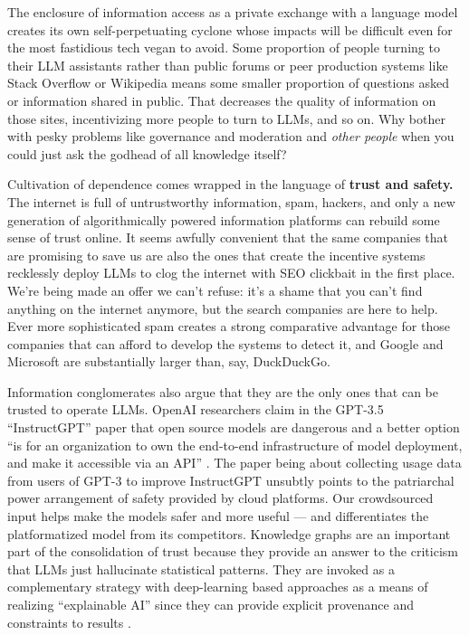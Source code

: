 The enclosure of information access as a private exchange with a
language model creates its own self-perpetuating cyclone whose impacts
will be difficult even for the most fastidious tech vegan to avoid. Some
proportion of people turning to their LLM assistants rather than public
forums or peer production systems like Stack Overflow or Wikipedia means
some smaller proportion of questions asked or information shared in
public. That decreases the quality of information on those sites,
incentivizing more people to turn to LLMs, and so on. Why bother with
pesky problems like governance and moderation and \emph{other people}
when you could just ask the godhead of all knowledge itself?

Cultivation of dependence comes wrapped in the language of \textbf{trust
and safety.} The internet is full of untrustworthy information, spam,
hackers, and only a new generation of algorithmically powered
information platforms can rebuild some sense of trust online. It seems
awfully convenient that the same companies that are promising to save us
are also the ones that create the incentive systems recklessly deploy
LLMs to clog the internet with SEO clickbait in the first place. We're
being made an offer we can't refuse: it's a shame that you can't find
anything on the internet anymore, but the search companies are here to
help. Ever more sophisticated spam creates a strong comparative
advantage for those companies that can afford to develop the systems to
detect it, and Google and Microsoft are substantially larger than, say,
DuckDuckGo.

Information conglomerates also argue that they are the only ones that
can be trusted to operate LLMs. OpenAI researchers claim in the GPT-3.5
``InstructGPT'' paper that open source models are dangerous and a better
option ``is for an organization to own the end-to-end infrastructure of
model deployment, and make it accessible via an API'' \cite{ouyangTrainingLanguageModels2022} . The paper being about collecting
usage data from users of GPT-3 to improve InstructGPT unsubtly points to
the patriarchal power arrangement of safety provided by cloud platforms.
Our crowdsourced input helps make the models safer and more useful ---
and differentiates the platformatized model from its competitors.
Knowledge graphs are an important part of the consolidation of trust
because they provide an answer to the criticism that LLMs just
hallucinate statistical patterns. They are invoked as a complementary strategy with deep-learning
based approaches as a means of realizing ``explainable AI'' since they
can provide explicit provenance and constraints to results \cite{lecueRoleKnowledgeGraphs2020, janowiczNeuralsymbolicIntegrationSemantic2020, tiddiKnowledgeGraphsEXplainable2020} .

